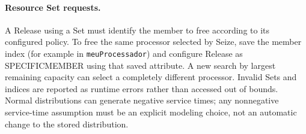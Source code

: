 \paragraph{Resource Set requests.}
A Release using a Set must identify the member to free according to its configured
policy. To free the same processor selected by Seize, save the member index (for
example in \texttt{meuProcessador}) and configure Release as SPECIFICMEMBER using
that saved attribute. A new search by largest remaining capacity can select a
completely different processor. Invalid Sets and indices are reported as runtime
errors rather than accessed out of bounds. Normal distributions can generate
negative service times; any nonnegative service-time assumption must be an
explicit modeling choice, not an automatic change to the stored distribution.
